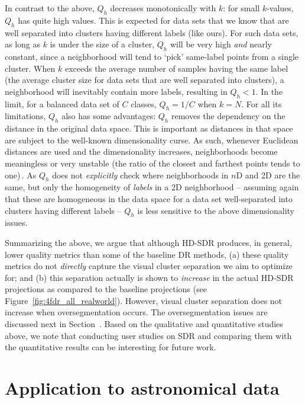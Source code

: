 \documentclass[sagev,Afour,times]{sagej}
\begin{document}
In contrast to the above, $Q_h$ decreases monotonically with $k$: for small $k$-values, $Q_h$ has quite high values. This is expected for data sets that we know that are well separated into clusters having different labels (like ours). For such data sets, as long as $k$ is under the size of a cluster, $Q_h$ will be very high \emph{and} nearly constant, since a neighborhood will tend to `pick' same-label points from a single cluster. When $k$ exceeds the average number of samples having the same label (the average cluster size for data sets that are well separated into clusters), a neighborhood will inevitably contain more labels, resulting in $Q_h < 1$. In the limit, for a balanced data set of $C$ classes, $Q_h = 1/C$ when $k=N$. 
For all its limitations, $Q_h$ also has some advantages: $Q_h$ removes the dependency on the distance in the original data space. This is important as distances in that space are subject to the well-known dimensionality curse. As such, whenever Euclidean distances are used and the dimensionality increases, neighborhoods become meaningless or very unstable (the ratio of the closest and farthest points tends to one)\,\cite{Aggarwal01}. As $Q_h$ does not \emph{explicitly} check where neighborhoods in $n$D and 2D are the same, but only the homogeneity of \emph{labels} in a 2D neighborhood -- assuming again that these are homogeneous in the data space for a data set well-separated into clusters having different labels -- $Q_h$ is less sensitive to the above dimensionality issues.

Summarizing the above, we argue that although HD-SDR produces, in general, lower quality metrics than some of the baseline DR methods, (a) these quality metrics do not \emph{directly} capture the visual cluster separation we aim to optimize for; and (b) this separation actually is shown to \emph{increase} in the actual HD-SDR projections as compared to the baseline projections (see Figure~\ref{fig:4fdr_all_realworld}). However, visual cluster separation does not increase when oversegmentation occurs. The oversegmentation issues are discussed next in Section~. Based on the qualitative and quantitative studies above, we note that conducting user studies on SDR and comparing them with the quantitative results can be interesting for future work.



\section{Application to astronomical data}
\label{sec:astro}
\end{document}
